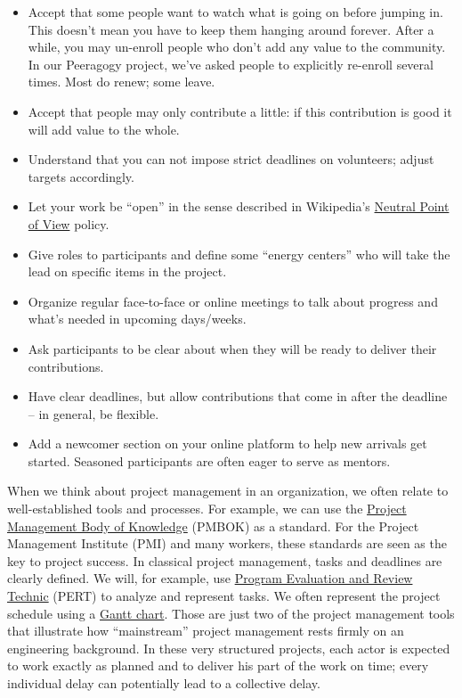 \begin{itemize}
\item
  Accept that some people want to watch what is going on before jumping
  in. This doesn't mean you have to keep them hanging around forever.
  After a while, you may un-enroll people who don't add any value to the
  community. In our Peeragogy project, we've asked people to explicitly
  re-enroll several times. Most do renew; some leave.
\item
  Accept that people may only contribute a little: if this contribution
  is good it will add value to the whole.
\item
  Understand that you can not impose strict deadlines on volunteers;
  adjust targets accordingly.
\item
  Let your work be ``open'' in the sense described in Wikipedia's
  \href{http://en.wikipedia.org/wiki/Wikipedia:Neutral\_point\_of\_view}{Neutral
  Point of View} policy.
\item
  Give roles to participants and define some ``energy centers'' who will
  take the lead on specific items in the project.
\item
  Organize regular face-to-face or online meetings to talk about
  progress and what's needed in upcoming days/weeks.
\item
  Ask participants to be clear about when they will be ready to deliver
  their contributions.
\item
  Have clear deadlines, but allow contributions that come in after the
  deadline -- in general, be flexible.
\item
  Add a newcomer section on your online platform to help new arrivals
  get started. Seasoned participants are often eager to serve as
  mentors.
\end{itemize}
When we think about project management in an organization, we often
relate to well-established tools and processes. For example, we can use
the \href{http://www.pmi.org/PMBOK-Guide-and-Standards.aspx}{Project
Management Body of Knowledge} (PMBOK) as a standard. For the Project
Management Institute (PMI) and many workers, these standards are seen as
the key to project success. In classical project management, tasks and
deadlines are clearly defined. We will, for example, use
\href{http://en.wikipedia.org/wiki/PERT}{Program Evaluation and Review
Technic} (PERT) to analyze and represent tasks. We often represent the
project schedule using a
\href{http://en.wikipedia.org/wiki/Gantt\_chart}{Gantt chart}. Those are
just two of the project management tools that illustrate how
``mainstream'' project management rests firmly on an engineering
background. In these very structured projects, each actor is expected to
work exactly as planned and to deliver his part of the work on time;
every individual delay can potentially lead to a collective delay.

